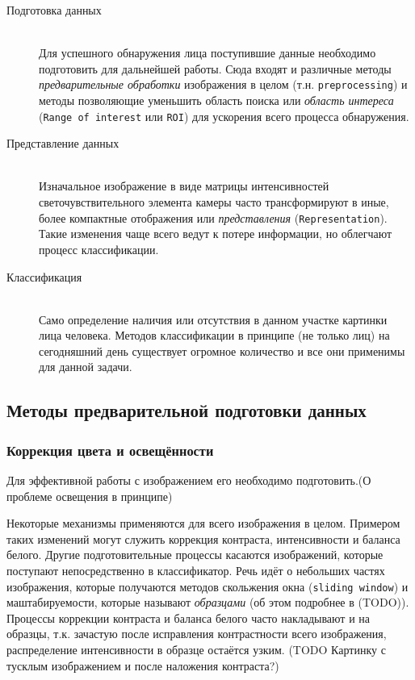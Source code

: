 \documentclass[12pt]{report}
\begin{document}
\begin{description}

\item[Подготовка данных]\hfill \\
	Для успешного обнаружения лица поступившие данные необходимо подготовить для дальнейшей работы. Сюда входят и различные методы \emph{предварительные обработки} изображения в целом (т.н. \texttt{preprocessing}) и методы позволяющие уменьшить область поиска или \emph{область интереса} (\texttt{Range of interest} или \texttt{ROI}) для ускорения всего процесса обнаружения.
\item[Представление данных]\hfill \\ 
	Изначальное изображение в виде матрицы интенсивностей светочувствительного элемента камеры часто трансформируют в иные, более компактные отображения или \emph{представления} (\texttt{Representation}). Такие изменения чаще всего ведут к потере информации, но облегчают процесс классификации.
\item[Классификация]\hfill \\ 
	Само определение наличия или отсутствия в данном участке картинки лица человека. Методов классификации в принципе (не только лиц) на сегодняшний день существует огромное количество и все они применимы для данной задачи.
\end{description}

\subsection{Методы предварительной подготовки данных}
\subsubsection{Коррекция цвета и освещённости}
Для эффективной работы с изображением его необходимо подготовить.(О проблеме освещения в принципе)

Некоторые механизмы применяются для всего изображения в целом. Примером таких изменений могут служить коррекция контраста, интенсивности и баланса белого. Другие подготовительные процессы касаются изображений, которые поступают непосредственно в классификатор. Речь идёт о небольших частях изображения, которые получаются методов скольжения окна (\texttt{sliding window}) и маштабируемости, которые называют \emph{образцами} (об этом подробнее в (TODO)). Процессы коррекции контраста и баланса белого часто накладывают и на образцы, т.к. зачастую после исправления контрастности всего изображения, распределение интенсивности в образце остаётся узким.
(TODO Картинку с тусклым изображением и после наложения контраста?)
\end{document}
